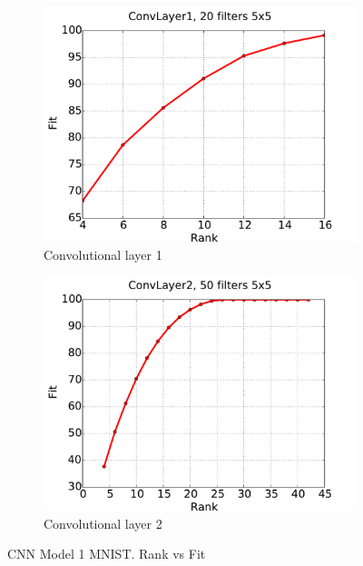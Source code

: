 \begin{figure}[h!]
  \centering
  \begin{subfigure}[b]{0.40\textwidth}
   \includegraphics[width=\textwidth]{images/model1_convL1_fit.pdf}
    \caption{Convolutional layer 1}
  \end{subfigure}
  \begin{subfigure}[b]{0.40\textwidth}
    \includegraphics[width=\textwidth]{images/model1_convL2_fit.pdf}
    \caption{Convolutional layer 2}
  \end{subfigure}
  \caption{CNN Model 1 MNIST. Rank vs Fit}
  \label{fig:cnn1fitness}
\end{figure}
